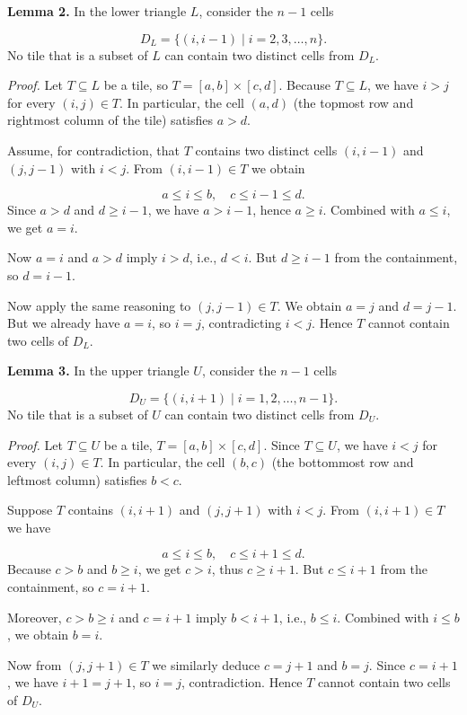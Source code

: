\textbf{Lemma 2.} In the lower triangle \(L\), consider the \(n-1\) cells\par
\[
D_L = \{(i,i-1) \mid i = 2,3,\dots,n\}.
\]
No tile that is a subset of \(L\) can contain two distinct cells from \(D_L\).\par
\emph{Proof.} Let \(T \subseteq L\) be a tile, so \(T = [a,b] \times [c,d]\). Because \(T \subseteq L\), we have \(i > j\) for every \((i,j) \in T\). In particular, the cell \((a,d)\) (the topmost row and rightmost column of the tile) satisfies \(a > d\).\par
Assume, for contradiction, that \(T\) contains two distinct cells \((i,i-1)\) and \((j,j-1)\) with \(i < j\). From \((i,i-1) \in T\) we obtain\par
\[
a \le i \le b,\quad c \le i-1 \le d.
\]
Since \(a > d\) and \(d \ge i-1\), we have \(a > i-1\), hence \(a \ge i\). Combined with \(a \le i\), we get \(a = i\).\par
Now \(a = i\) and \(a > d\) imply \(i > d\), i.e., \(d < i\). But \(d \ge i-1\) from the containment, so \(d = i-1\).\par
Now apply the same reasoning to \((j,j-1) \in T\). We obtain \(a = j\) and \(d = j-1\). But we already have \(a = i\), so \(i = j\), contradicting \(i < j\). Hence \(T\) cannot contain two cells of \(D_L\).\par
\textbf{Lemma 3.} In the upper triangle \(U\), consider the \(n-1\) cells\par
\[
D_U = \{(i,i+1) \mid i = 1,2,\dots,n-1\}.
\]
No tile that is a subset of \(U\) can contain two distinct cells from \(D_U\).\par
\emph{Proof.} Let \(T \subseteq U\) be a tile, \(T = [a,b] \times [c,d]\). Since \(T \subseteq U\), we have \(i < j\) for every \((i,j) \in T\). In particular, the cell \((b,c)\) (the bottommost row and leftmost column) satisfies \(b < c\).\par
Suppose \(T\) contains \((i,i+1)\) and \((j,j+1)\) with \(i < j\). From \((i,i+1) \in T\) we have\par
\[
a \le i \le b,\quad c \le i+1 \le d.
\]
Because \(c > b\) and \(b \ge i\), we get \(c > i\), thus \(c \ge i+1\). But \(c \le i+1\) from the containment, so \(c = i+1\).\par
Moreover, \(c > b \ge i\) and \(c = i+1\) imply \(b < i+1\), i.e., \(b \le i\). Combined with \(i \le b\), we obtain \(b = i\).\par
Now from \((j,j+1) \in T\) we similarly deduce \(c = j+1\) and \(b = j\). Since \(c = i+1\), we have \(i+1 = j+1\), so \(i = j\), contradiction. Hence \(T\) cannot contain two cells of \(D_U\).\par

